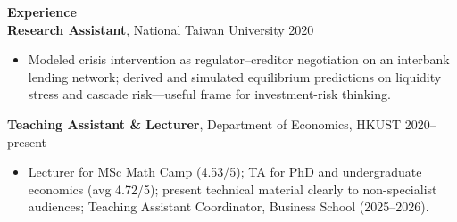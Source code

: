 \documentclass[11pt,letterpaper]{article}
\begin{document}
{\large \textbf{Experience}}\\[-0.5pt]
\textbf{Research Assistant}, National Taiwan University \hfill 2020\\
\vspace{-6pt}
\begin{itemize}
  \item Modeled crisis intervention as regulator--creditor negotiation on an interbank lending network; derived and simulated equilibrium predictions on liquidity stress and cascade risk---useful frame for investment-risk thinking.
\end{itemize}
\textbf{Teaching Assistant \& Lecturer}, Department of Economics, HKUST \hfill 2020--present\\
\vspace{-6pt}
\begin{itemize}
  \item Lecturer for MSc Math Camp (4.53/5); TA for PhD and undergraduate economics (avg 4.72/5); present technical material clearly to non-specialist audiences; Teaching Assistant Coordinator, Business School (2025--2026).
\end{itemize}

\vspace{0.15pt}
\end{document}
